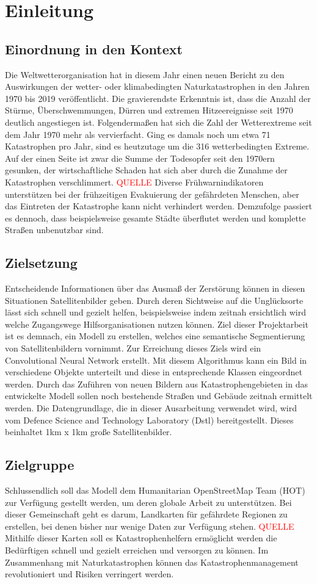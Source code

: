 \section{Einleitung}
\subsection{Einordnung in den Kontext}
Die Weltwetterorganisation hat in diesem Jahr einen neuen Bericht zu den Auswirkungen der
wetter- oder klimabedingten Naturkatastrophen in den Jahren 1970 bis 2019 veröffentlicht.
Die gravierendste Erkenntnis ist, dass die Anzahl der Stürme, Überschwemmungen, Dürren und
extremen Hitzeereignisse seit 1970 deutlich angestiegen ist.
Folgendermaßen hat sich die Zahl der Wetterextreme seit dem Jahr 1970 mehr als vervierfacht.
Ging es damals noch um etwa 71 Katastrophen pro Jahr, sind es heutzutage um die 316
wetterbedingten Extreme.
Auf der einen Seite ist zwar die Summe der Todesopfer seit den 1970ern gesunken,
der wirtschaftliche Schaden hat sich aber durch die Zunahme der Katastrophen verschlimmert.
	{\textcolor{red}{QUELLE}}
Diverse Frühwarnindikatoren unterstützen bei der frühzeitigen Evakuierung der gefährdeten
Menschen, aber das Eintreten der Katastrophe kann nicht verhindert werden.
Demzufolge passiert es dennoch, dass beispielsweise gesamte Städte überflutet werden und
komplette Straßen unbenutzbar sind.
\subsection{Zielsetzung}
Entscheidende Informationen über das Ausmaß der Zerstörung können in diesen Situationen
Satellitenbilder geben.
Durch deren Sichtweise auf die Unglücksorte lässt sich schnell und gezielt helfen,
beispielsweise indem zeitnah ersichtlich wird welche Zugangswege Hilfsorganisationen nutzen können.
Ziel dieser Projektarbeit ist es demnach, ein Modell zu erstellen,
welches eine semantische Segmentierung von Satellitenbildern vornimmt.
Zur Erreichung dieses Ziels wird ein Convolutional Neural Network erstellt.
Mit diesem Algorithmus kann ein Bild in verschiedene Objekte unterteilt und diese in entsprechende
Klassen eingeordnet werden.
Durch das Zuführen von neuen Bildern aus Katastrophengebieten in das entwickelte Modell sollen noch bestehende
Straßen und Gebäude zeitnah ermittelt werden.
Die Datengrundlage, die in dieser Ausarbeitung verwendet wird, wird vom
Defence Science and Technology Laboratory (Dstl) bereitgestellt.
Dieses beinhaltet 1km x 1km große Satellitenbilder.
\subsection{Zielgruppe}
Schlussendlich soll das Modell dem Humanitarian OpenStreetMap Team (HOT) zur Verfügung gestellt werden,
um deren globale Arbeit zu unterstützen.
Bei dieser Gemeinschaft geht es darum, Landkarten für gefährdete Regionen zu erstellen,
bei denen bisher nur wenige Daten zur Verfügung stehen. {\textcolor{red}{QUELLE}}
Mithilfe dieser Karten soll es Katastrophenhelfern ermöglicht werden die Bedürftigen schnell und gezielt
erreichen und versorgen zu können.
Im Zusammenhang mit Naturkatastrophen können das Katastrophenmanagement revolutioniert und Risiken verringert werden.


